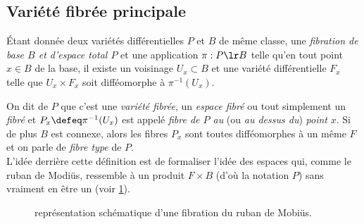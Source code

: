 \subsection{Variété fibrée principale}

\begin{definition}
	\'Etant donnée deux variétés différentielles $P$ et $B$ de même classe, une \emph{fibration de base $B$ et d'espace total $P$} et une application $\pi : P\lr B$ telle qu'en tout point $x\in B$ de la base, il existe un voisinage $U_x\subset B$ et une variété différentielle $F_x$ telle que $U_x\times F_x$ soit difféomorphe à $\pi^{-1}(U_x)$.
	
	On dit de $P$ que c'est une \emph{variété fibrée}, un \emph{espace fibré} ou tout simplement un \emph{fibré} et $P_x \defeq \pi^{-1}(U_x)$ est appelé \emph{fibre de $P$ au} (ou \emph{au dessus du}) \emph{point} $x$.
	Si de plus $B$ est connexe, alors les fibres $P_x$ sont toutes difféomorphes à un même $F$ et on parle de \emph{fibre type} de $P$.
	\\
	
	L'idée derrière cette définition est de formaliser l'idée des espaces qui, comme le ruban de Modiüs, ressemble à un produit $F\times B$ (d'où la notation $P$) sans vraiment en être un (voir \cref{fig:fibration}).
\end{definition}

\begin{figure}[h]\centering
	\caption{représentation schématique d'une fibration du ruban de Mobiüs.}
	\label{fig:fibration}
\end{figure}


